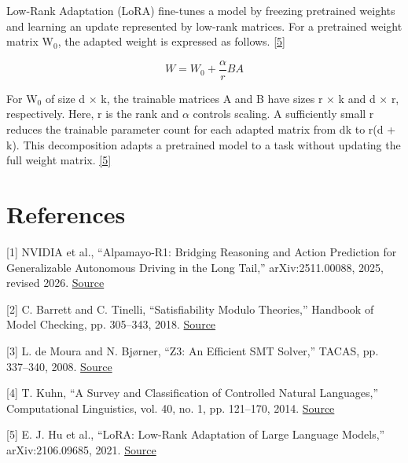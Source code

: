 \documentclass[11pt,a4paper]{article}
\begin{document}
Low-Rank Adaptation (LoRA) fine-tunes a model by freezing pretrained weights and learning an update represented by low-rank matrices. For a pretrained weight matrix W\ensuremath{{}_0}, the adapted weight is expressed as follows. \href{\detokenize{https://arxiv.org/abs/2106.09685}}{[5]}\par

\[W = W_0 + \frac{\alpha}{r}BA\]

For W\ensuremath{{}_0} of size d × k, the trainable matrices A and B have sizes r × k and d × r, respectively. Here, r is the rank and \ensuremath{\alpha} controls scaling. A sufficiently small r reduces the trainable parameter count for each adapted matrix from dk to r(d + k). This decomposition adapts a pretrained model to a task without updating the full weight matrix. \href{\detokenize{https://arxiv.org/abs/2106.09685}}{[5]}\par

\section*{References}

[1] NVIDIA et al., “Alpamayo-R1: Bridging Reasoning and Action Prediction for Generalizable Autonomous Driving in the Long Tail,” arXiv:2511.00088, 2025, revised 2026. \href{\detokenize{https://arxiv.org/abs/2511.00088}}{Source}\par

[2] C. Barrett and C. Tinelli, “Satisfiability Modulo Theories,” Handbook of Model Checking, pp. 305–343, 2018. \href{\detokenize{https://theory.stanford.edu/~barrett/pubs/BT18.pdf}}{Source}\par

[3] L. de Moura and N. Bjørner, “Z3: An Efficient SMT Solver,” TACAS, pp. 337–340, 2008. \href{\detokenize{https://doi.org/10.1007/978-3-540-78800-3_24}}{Source}\par

[4] T. Kuhn, “A Survey and Classification of Controlled Natural Languages,” Computational Linguistics, vol. 40, no. 1, pp. 121–170, 2014. \href{\detokenize{https://aclanthology.org/J14-1005/}}{Source}\par

[5] E. J. Hu et al., “LoRA: Low-Rank Adaptation of Large Language Models,” arXiv:2106.09685, 2021. \href{\detokenize{https://arxiv.org/abs/2106.09685}}{Source}\par
\end{document}
